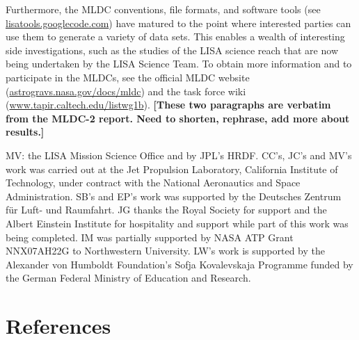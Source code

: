 \documentclass{iopart}
\begin{document}
Furthermore, the MLDC conventions, file formats, and software tools (see \url{lisatools.googlecode.com}) have matured to the point where interested parties can use them to generate a variety of data sets. This enables a wealth of interesting side investigations, such as the studies of the LISA science reach that are now being undertaken by the LISA Science Team. To obtain more information and to participate in the MLDCs, see the official MLDC website (\url{astrogravs.nasa.gov/docs/mldc}) and the task force wiki (\url{www.tapir.caltech.edu/listwg1b}).
\textbf{[These two paragraphs are verbatim from the MLDC-2 report. Need to shorten, rephrase, add more about results.]}

\ack

MV: the LISA Mission Science Office and by JPL's HRDF.
CC's, JC's and MV's work was carried out at the Jet Propulsion Laboratory, California Institute of Technology, under contract with the National Aeronautics and Space Administration.
SB's and EP's work was supported by the Deutsches Zentrum f\"ur Luft- und Raumfahrt.
JG thanks the Royal Society for support and the Albert Einstein
Institute for hospitality and support while part of this work was
being completed. IM was partially supported by NASA ATP Grant
NNX07AH22G to Northwestern University. LW's work is supported by the
Alexander von Humboldt Foundation's Sofja Kovalevskaja Programme
funded by the German Federal Ministry of Education and Research.




\section*{References}
\end{document}

